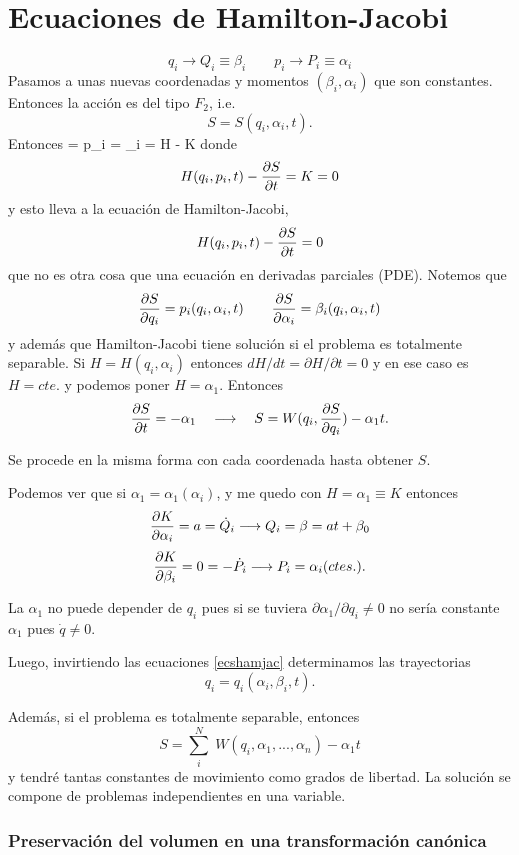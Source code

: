 \documentclass[10pt,oneside]{CBFT_book}
\begin{document}
\chapter{Ecuaciones de Hamilton-Jacobi}

\[
	q_i \longrightarrow Q_i \equiv \beta_i \qquad p_i \longrightarrow P_i \equiv \alpha_i
\]
Pasamos a unas nuevas coordenadas y momentos $(\beta_i,\alpha_i)$ que son constantes. Entonces
la acción es del tipo $F_2$, i.e.
\[
	S = S(q_i, \alpha_i, t).
\]
Entonces
\be
	 = p_i \qquad {} = \beta_i \qquad {} = H - K  
\label{ecshamjac}	
\ee
donde 
\[
	H(q_i,p_i,t) - \frac{\partial^{\hspace{-0.05em}} {S}}{\partial {t}^{\hspace{-0.05em}}} = K = 0
\]
y esto lleva a la ecuación de Hamilton-Jacobi,
\[
	H(q_i,p_i,t) - \frac{\partial^{\hspace{-0.05em}} {S}}{\partial {t}^{\hspace{-0.05em}}} = 0
\]
que no es otra cosa que una ecuación en derivadas parciales (PDE). Notemos que 
\[
	\frac{\partial^{\hspace{-0.05em}} {S}}{\partial {q_i}^{\hspace{-0.05em}}} = p_i(q_i,\alpha_i,t) \qquad \frac{\partial^{\hspace{-0.05em}} {S}}{\partial {\alpha_i}^{\hspace{-0.05em}}} = \beta_i(q_i,\alpha_i,t)
\]
y además que Hamilton-Jacobi tiene solución si el problema es totalmente separable.
Si $H=H(q_i,\alpha_i)$ entonces $dH/dt = \partial H/\partial t=0$ y en ese caso es $H=cte.$ y
podemos poner $H=\alpha_1$.
Entonces
\[
	\frac{\partial^{\hspace{-0.05em}} {S}}{\partial {t}^{\hspace{-0.05em}}} = -\alpha_1 \quad \longrightarrow \quad S=W(q_i,\frac{\partial^{\hspace{-0.05em}} {S}}{\partial {q_i}^{\hspace{-0.05em}}}) -\alpha_1 t .
\]

Se procede en la misma forma con cada coordenada hasta obtener $S$.

Podemos ver que si $\alpha_1 = \alpha_1(\alpha_i)$, y me quedo con $H=\alpha_1 \equiv K$ entonces
\[
	\frac{\partial^{\hspace{-0.05em}} {K}}{\partial {\alpha_i}^{\hspace{-0.05em}}} = a = \dot{Q}_i \longrightarrow Q_i = \beta = a t + \beta_0 
\]
\[
	\frac{\partial^{\hspace{-0.05em}} {K}}{\partial {\beta_i}^{\hspace{-0.05em}}} = 0 = -\dot{P}_i \longrightarrow P_i = \alpha_i (ctes.).
\]

La $\alpha_1$ no puede depender de $q_i$ pues si se tuviera $\partial \alpha_1 /\partial q_i \neq 0$ 
no sería constante $\alpha_1$ pues $\dot{q}\neq 0$.

Luego, invirtiendo las ecuaciones \eqref{ecshamjac} determinamos las trayectorias
\[
	q_i = q_i(\alpha_i, \beta_i, t).
\]

Además, si el problema es totalmente separable, entonces
\[
	S = \sum_i^N \; W(q_i, \alpha_1,...,\alpha_n) - \alpha_1 t
\]
y tendré tantas constantes de movimiento como grados de libertad. La solución se compone de problemas
independientes en una variable.

\subsection{Preservación del volumen en una transformación canónica}
\end{document}
